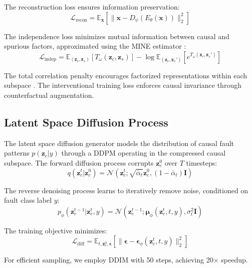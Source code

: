 \documentclass[lettersize,journal]{IEEEtran}
\begin{document}
The reconstruction loss ensures information preservation:
\begin{equation}
\mathcal{L}_{\text{recon}} = \mathbb{E}_{\mathbf{x}}[\|\mathbf{x} - D_\psi(E_\theta(\mathbf{x}))\|_2^2]
\end{equation}

The independence loss minimizes mutual information between causal and spurious factors, approximated using the MINE estimator \cite{ref29}:
\begin{equation}
\mathcal{L}_{\text{indep}} = \mathbb{E}_{(\mathbf{z}_c,\mathbf{z}_s)}[T_\omega(\mathbf{z}_c,\mathbf{z}_s)] - \log\mathbb{E}_{(\mathbf{z}_c,\mathbf{z}_s')}[e^{T_\omega(\mathbf{z}_c,\mathbf{z}_s')}]
\end{equation}

The total correlation penalty encourages factorized representations within each subspace \cite{ref19}. The interventional training loss enforces causal invariance through counterfactual augmentation.

\subsection{Latent Space Diffusion Process}

The latent space diffusion generator models the distribution of causal fault patterns $p(\mathbf{z}_c|y)$ through a DDPM operating in the compressed causal subspace. The forward diffusion process corrupts $\mathbf{z}_c^0$ over $T$ timesteps:
\begin{equation}
q(\mathbf{z}_c^t|\mathbf{z}_c^0) = \mathcal{N}(\mathbf{z}_c^t; \sqrt{\bar{\alpha}_t}\mathbf{z}_c^0, (1-\bar{\alpha}_t)\mathbf{I})
\end{equation}

The reverse denoising process learns to iteratively remove noise, conditioned on fault class label $y$:
\begin{equation}
p_\phi(\mathbf{z}_c^{t-1}|\mathbf{z}_c^t, y) = \mathcal{N}(\mathbf{z}_c^{t-1}; \boldsymbol{\mu}_\phi(\mathbf{z}_c^t, t, y), \sigma_t^2\mathbf{I})
\end{equation}

The training objective minimizes:
\begin{equation}
\mathcal{L}_{\text{diff}} = \mathbb{E}_{t, \mathbf{z}_c^0, \boldsymbol{\epsilon}}\left[\|\boldsymbol{\epsilon} - \boldsymbol{\epsilon}_\phi(\mathbf{z}_c^t, t, y)\|_2^2\right]
\end{equation}

For efficient sampling, we employ DDIM \cite{ref20} with 50 steps, achieving 20$\times$ speedup.
\end{document}
